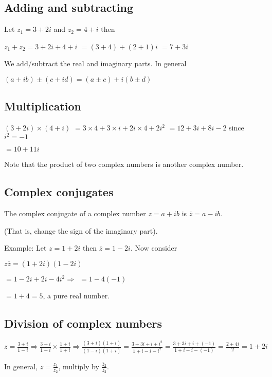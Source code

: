 \documentclass{extarticle}
\begin{document}
\begin{multicols}{2}
\subsection{Adding and subtracting}

Let $z_1=3+2i$ and $z_2=4+i$ then

$z_1+z_2=3+2i+4+i$
$=\left(3+4\right)+\left(2+1\right)i$
$=7+3i$


We add/subtract the real and imaginary parts.
In general

$\left(a+ib\right)\pm\left(c+id\right)=\left(a\pm c\right)+i\left(b\pm d\right)$

\subsection{Multiplication}

$\left(3+2i\right)\times\left(4+i\right)$ $=3\times4+3\times i+2i\times4+2i^2$ $=12+3i+8i-2$
since $i^2=-1$

$=10+11i$

Note that the product of two complex numbers is another complex number.


\subsection{Complex conjugates}

The complex conjugate of a complex number $z=a+ib$ is $\overline{z}=a-ib$. 

(That is, change the sign of the imaginary part).

Example: Let $z=1+2i$ then $\overline{z}=1-2i$. Now consider

$z\overline{z}=\left(1+2i\right)\left(1-2i\right)$

$=1-2i+2i-4i^2\Rightarrow\ \ =1-4\left(-1\right)$

$=1+4=5$, a pure real number.



\subsection{Division of complex numbers}

$z=\frac{3+i}{1-i}\Rightarrow\frac{3+i}{1-i}\times\frac{1+i}{1+i}\Rightarrow\frac{\left(3+i\right)\left(1+i\right)}{\left(1-i\right)\left(1+i\right)}=\frac{3+3i+i+i^2}{1+i-i-i^2}=\frac{3+3i+i+(-1)}{1+i-i-(-1)}=\frac{2+4i}{2}=1+2i$

In general, $z=\frac{z_1}{z_2}$, multiply by $\frac{{\overline{z}}_2}{{\overline{z}}_2}$.


\end{multicols}
\end{document}
